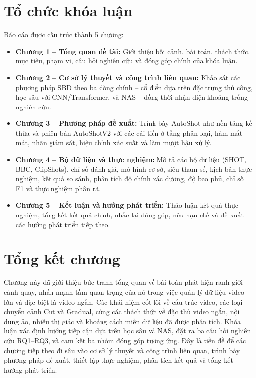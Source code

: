 \section{Tổ chức khóa luận}
Báo cáo được cấu trúc thành 5 chương:
\begin{itemize}
    \item \textbf{Chương 1 -- Tổng quan đề tài:} Giới thiệu bối cảnh, bài toán, thách thức, mục tiêu, phạm vi, câu hỏi nghiên cứu và đóng góp chính của khóa luận.
    \item \textbf{Chương 2 -- Cơ sở lý thuyết và công trình liên quan:} Khảo sát các phương pháp SBD theo ba dòng chính -- cổ điển dựa trên đặc trưng thủ công, học sâu với CNN/Transformer, và NAS -- đồng thời nhận diện khoảng trống nghiên cứu.
    \item \textbf{Chương 3 -- Phương pháp đề xuất:} Trình bày AutoShot như nền tảng kế thừa và phiên bản AutoShotV2 với các cải tiến ở tầng phân loại, hàm mất mát, nhãn giám sát, hiệu chỉnh xác suất và làm mượt hậu xử lý.
    \item \textbf{Chương 4 -- Bộ dữ liệu và thực nghiệm:} Mô tả các bộ dữ liệu (SHOT, BBC, ClipShots), chỉ số đánh giá, mô hình cơ sở, siêu tham số, kịch bản thực nghiệm, kết quả so sánh, phân tích độ chính xác dương, độ bao phủ, chỉ số F1 và thực nghiệm phân rã.
    \item \textbf{Chương 5 -- Kết luận và hướng phát triển:} Thảo luận kết quả thực nghiệm, tổng kết kết quả chính, nhắc lại đóng góp, nêu hạn chế và đề xuất các hướng phát triển tiếp theo.
\end{itemize}

\section{Tổng kết chương}
Chương này đã giới thiệu bức tranh tổng quan về bài toán phát hiện ranh giới cảnh quay, nhấn mạnh tầm quan trọng của nó trong việc quản lý dữ liệu video lớn và đặc biệt là video ngắn. Các khái niệm cốt lõi về cấu trúc video, các loại chuyển cảnh Cut và Gradual, cùng các thách thức về đặc thù video ngắn, nội dung ảo, nhiễu thị giác và khoảng cách miền dữ liệu đã được phân tích. Khóa luận xác định hướng tiếp cận dựa trên học sâu và NAS, đặt ra ba câu hỏi nghiên cứu RQ1--RQ3, và cam kết ba nhóm đóng góp tương ứng. Đây là tiền đề để các chương tiếp theo đi sâu vào cơ sở lý thuyết và công trình liên quan, trình bày phương pháp đề xuất, thiết lập thực nghiệm, phân tích kết quả và tổng kết hướng phát triển.
